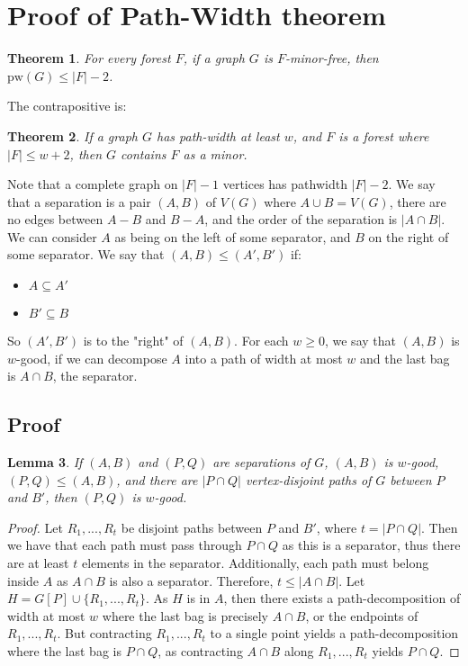\documentclass[]{article}
\newcommand{\pw}{\text{pw}}
\newtheorem{theorem}{Theorem}
\newtheorem{lemma}[theorem]{Lemma}
\theoremstyle{definition}
\numberwithin{theorem}{section}
\numberwithin{equation}{section}
\begin{document}
\section{Proof of Path-Width theorem}
\begin{theorem}
	\label{thm:Path-Width theorem }
	For every forest $F$, if a graph $G$ is $F$-minor-free, then $\pw(G) \leq |F| - 2$.
\end{theorem}
The contrapositive is:
\begin{theorem}
	\label{thm:pw-tree contrapositive }
	If a graph $G$ has path-width at least $w$, and $F$ is a forest where $|F| \leq w + 2$, then $G$ contains $F$ as a minor. 
\end{theorem}
Note that a complete graph on $|F|-1$ vertices has pathwidth $|F| - 2$. 
We say that a separation is a pair $(A, B)$ of $V(G)$ where $A \cup B = V(G)$, there are no edges between $A - B$ and $B - A$, and the order of the separation is $|A \cap B |$. We can consider $A$ as being on the left of some separator, and $B$ on the right of some separator. We say that $(A, B) \leq (A', B')$ if:
\begin{itemize}
	\item $A \subseteq A'$
	\item $B' \subseteq B$
\end{itemize}
So $(A', B')$ is to the "right" of $(A, B)$. For each $w \geq 0$, we say that $(A, B)$ is $w$-good, if we can decompose $A$ into a path of width at most $w$ and the last bag is $A \cap B$, the separator. 

\subsection{Proof}
\begin{lemma}
	If $(A, B)$ and $(P, Q)$ are separations of $G$, $(A, B)$ is $w$-good, $(P, Q) \leq (A, B)$, and there are $|P \cap Q|$ vertex-disjoint paths of $G$ between $P$ and $B'$, then $(P, Q)$ is $w$-good. 
\end{lemma}
\begin{proof}
	Let $R_1, ..., R_t$ be disjoint paths between $P$ and $B'$, where $t = | P \cap Q|$. Then we have that each path must pass through $P \cap Q$ as this is a separator, thus there are at least $t$ elements in the separator. Additionally, each path must belong inside $A$ as $A \cap B$ is also a separator. Therefore, $t \leq |A \cap B|$. 
	Let $H = G[P] \cup \lbrace R_1, ..., R_t \rbrace$. As $H$ is in $A$, then there exists a path-decomposition of width at most $w$ where the last bag is precisely $A \cap B$, or the endpoints of $R_1, ..., R_t$. But contracting $R_1, ..., R_t$ to a single point yields a path-decomposition where the last bag is $P \cap Q$, as contracting $A \cap B$ along $R_1, ..., R_t$ yields $P \cap Q$. 
\end{proof}
\end{document}
